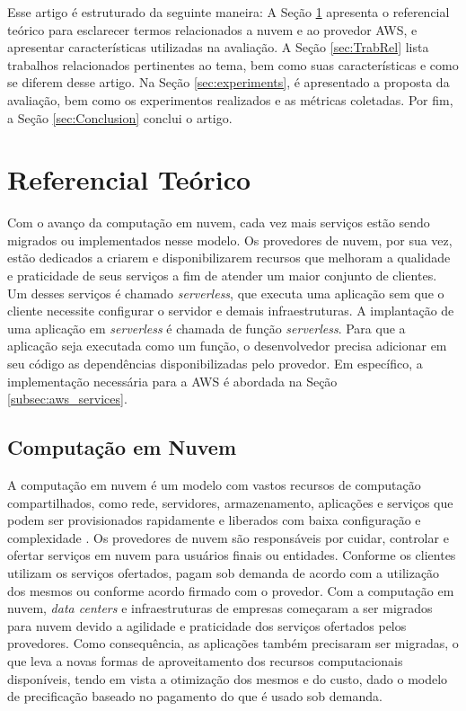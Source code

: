 \documentclass[conference]{IEEEtran}
\begin{document}
Esse artigo é estruturado da seguinte maneira: A Seção \ref{sec:RefTeo} apresenta o referencial teórico para esclarecer termos relacionados a nuvem e ao provedor AWS, e apresentar características utilizadas na avaliação. A Seção \ref{sec:TrabRel} lista trabalhos relacionados pertinentes ao tema, bem como suas características e como se diferem desse artigo. Na Seção \ref{sec:experiments}, é apresentado a proposta da avaliação, bem como os experimentos realizados e as métricas coletadas. Por fim, a Seção \ref{sec:Conclusion} conclui o artigo.

\section{Referencial Teórico} 
\label{sec:RefTeo}

Com o avanço da computação em nuvem, cada vez mais serviços estão sendo migrados ou implementados nesse modelo. Os provedores de nuvem, por sua vez, estão dedicados a criarem e disponibilizarem recursos que melhoram a qualidade e praticidade de seus serviços a fim de atender um maior conjunto de clientes. Um desses serviços é chamado \textit{serverless}, que executa uma aplicação sem que o cliente necessite configurar o servidor e demais infraestruturas. A implantação de uma aplicação em \textit{serverless} é chamada de função \textit{serverless}. Para que a aplicação seja executada como um função, o desenvolvedor precisa adicionar em seu código as dependências disponibilizadas pelo provedor. Em específico, a implementação necessária para a AWS é abordada na Seção \ref{subsec:aws_services}.
    
\subsection{Computação em Nuvem}
\label{subsec:cloud}

A computação em nuvem é um modelo com vastos recursos de computação compartilhados, como rede, servidores, armazenamento, aplicações e serviços que podem ser provisionados rapidamente e liberados com baixa configuração e complexidade \cite{nist_2011_cloud_computing}.
Os provedores de nuvem são responsáveis por cuidar, controlar e ofertar serviços em nuvem para usuários finais ou entidades. Conforme os clientes utilizam os serviços ofertados, pagam sob demanda de acordo com a utilização dos mesmos ou conforme acordo firmado com o provedor. Com a computação em nuvem, \textit{data centers} e infraestruturas de empresas começaram a ser migrados para nuvem devido a agilidade e praticidade dos serviços ofertados pelos provedores. Como consequência, as aplicações também precisaram ser migradas, o que leva a novas formas de aproveitamento dos recursos computacionais disponíveis, tendo em vista a otimização dos mesmos e do custo, dado o modelo de precificação baseado no pagamento do que é usado sob demanda.
\end{document}
